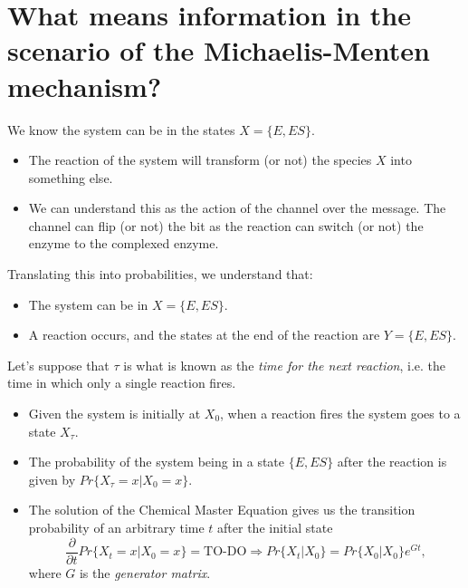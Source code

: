 \documentclass[11pt]{amsart}
\begin{document}
\section{What means information in the scenario of the Michaelis-Menten mechanism?}

We know the system can be in the states $X = \{E, ES\}$.
\begin{itemize}
\item The reaction of the system will transform (or not) the species $X$ into something else.
\item We can understand this as the action of the channel over the message. The channel can flip (or not) the bit as the reaction can switch (or not) the enzyme to the complexed enzyme.
\end{itemize}

Translating this into probabilities, we understand that:
\begin{itemize}
\item The system can be in $X = \{E, ES\}$.
\item A reaction occurs, and the states at the end of the reaction are $Y = \{E, ES\}$.
\end{itemize}

\vspace{10pt}
Let's suppose that $\tau$ is what is known as the {\it time for the next reaction}, i.e. the time in which only a single reaction fires.

\begin{itemize}
\item Given the system is initially at $X_0$, when a reaction fires the system goes to a state $X_\tau$.
\item The probability of the system being in a state $\{E, ES\}$ after the reaction is given by $Pr\{X_\tau = x | X_0 = x\}$.
\item The solution of the Chemical Master Equation gives us the transition probability of an arbitrary time $t$ after the initial state
$$\frac{\partial}{\partial t} Pr\{X_t = x | X_0 = x\} = \text{TO-DO} \Rightarrow Pr\{X_t | X_0 \} = Pr\{X_0 | X_0 \} e^{Gt},$$
where $G$ is the {\it generator matrix}.
\end{itemize}
\end{document}
